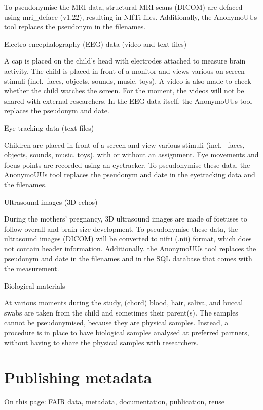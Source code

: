 \documentclass[
]{book}
\begin{document}
To pseudonymise the MRI data, structural MRI scans (DICOM) are defaced using
mri\_deface
(v1.22), resulting in NIfTi files. Additionally, the AnonymoUUs tool replaces
the pseudonym in the filenames.

Electro-encephalography (EEG) data (video and text files)

A cap is placed on the child's head with electrodes attached to measure
brain activity. The child is placed in front of a monitor and views various
on-screen stimuli (incl.~faces, objects, sounds, music, toys). A video is also
made to check whether the child watches the screen. For the moment, the videos
will not be shared with external researchers. In the EEG data itself, the
AnonymoUUs tool replaces the pseudonym and date.

Eye tracking data (text files)

Children are placed in front of a screen and view various stimuli (incl.~
faces, objects, sounds, music, toys), with or without an assignment. Eye
movements and focus points are recorded using an eyetracker. To pseudonymise
these data, the AnonymoUUs tool replaces the pseudonym and date in the
eyetracking data and the filenames.

Ultrasound images (3D echos)

During the mothers' pregnancy, 3D ultrasound images are made of foetuses
to follow overall and brain size development. To pseudonymise these data, the
ultrasound images (DICOM) will be converted to nifti (.nii) format, which does
not contain header information. Additionally, the AnonymoUUs tool replaces the
pseudonym and date in the filenames and in the SQL database that comes with the
measurement.

Biological materials

At various moments during the study, (chord) blood, hair, saliva, and
buccal swabs are taken from the child and sometimes their parent(s). The samples
cannot be pseudonymised, because they are physical samples. Instead, a procedure
is in place to have biological samples analysed at preferred partners, without
having to share the physical samples with researchers.

\hypertarget{open-science-questionnaire}{%
\chapter{Publishing metadata}\label{open-science-questionnaire}}

On this page: FAIR data, metadata, documentation, publication, reuse
\end{document}
